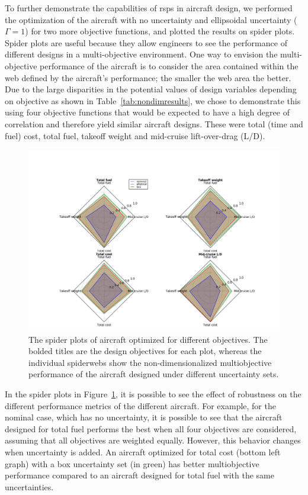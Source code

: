 To further demonstrate the capabilities of \gls{rsp}s in aircraft design,
we performed the optimization of the aircraft with no uncertainty and ellipsoidal uncertainty ($\Gamma = 1$)
for two more objective functions, and plotted the results on spider plots.
Spider plots are useful because they allow engineers to see the performance of different designs in a multi-objective
environment. One way to envision the multi-objective
performance of the aircraft is to consider the area contained within the web defined by the aircraft's
performance; the smaller the web area the better. Due to the large disparities in the potential values of design variables depending
on objective as shown in Table~\ref{tab:nondimresults}, we chose to demonstrate this using four objective functions
that would be expected to have a high degree of correlation and therefore yield similar aircraft designs. These were
 total (time and fuel) cost, total fuel, takeoff weight and mid-cruise lift-over-drag (L/D).

\begin{figure}
    \includegraphics[width = 0.95\linewidth]{figures/4objradar.png}
    \caption{The spider plots of aircraft optimized for different objectives.
    The bolded titles are the design objectives for each plot, whereas the individual spiderwebs
    show the non-dimensionalized multiobjective performance of the aircraft designed under different
    uncertainty sets.}
    \label{fig:spider}
\end{figure}

In the spider plots in Figure~\ref{fig:spider}, it is possible to see the effect of robustness on
the different performance metrics of the different aircraft.
For example, for the nominal case, which has no uncertainty, it is possible to see that
the aircraft designed for total fuel performs the best when all four objectives are considered,
assuming that all objectives are weighted equally.
However, this behavior changes when uncertainty is added. An aircraft optimized for total cost
(bottom left graph) with a box uncertainty set (in green) has better multiobjective performance
compared to an aircraft designed for total fuel with the same uncertainties.

